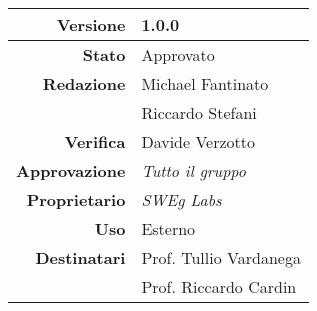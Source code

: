 \begin{center}
\begin{tabular}{r|l}
    \textbf{Versione} & 1.0.0 \\
    \hline
    \textbf{Stato} & Approvato \\
    \hline
    \textbf{Redazione} & Michael Fantinato \\
                       & Riccardo Stefani \\
    \hline
    \textbf{Verifica} & Davide Verzotto \\
    \hline
    \textbf{Approvazione} & \emph{Tutto il gruppo} \\
    \hline
    \textbf{Proprietario} & \emph{SWEg Labs} \\
    \hline
    \textbf{Uso} & Esterno \\
    \hline
    \textbf{Destinatari} & Prof. Tullio Vardanega \\
                         & Prof. Riccardo Cardin \\
\end{tabular}
\end{center}

